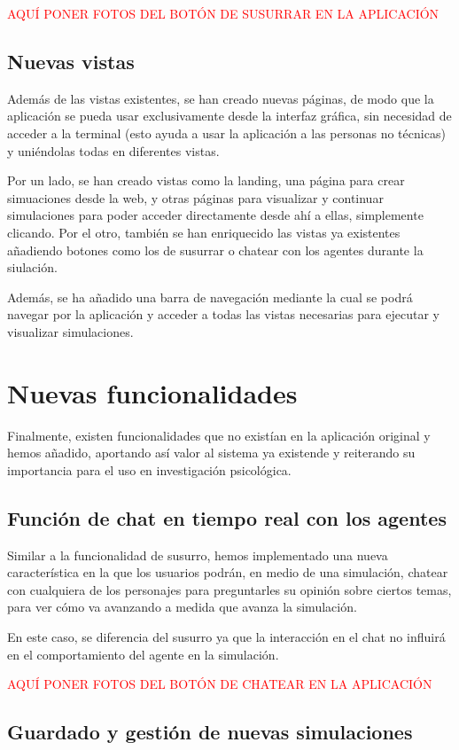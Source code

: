 \textcolor{red}{AQUÍ PONER FOTOS DEL BOTÓN DE SUSURRAR EN LA APLICACIÓN}

\subsection{Nuevas vistas}
Además de las vistas existentes, se han creado nuevas páginas, de modo que la aplicación se pueda usar exclusivamente desde la interfaz gráfica, sin necesidad de acceder a la terminal (esto ayuda a usar la aplicación a las personas no técnicas) y uniéndolas todas en diferentes vistas.

Por un lado, se han creado vistas como la landing, una página para crear simuaciones desde la web, y otras páginas para visualizar y continuar simulaciones para poder acceder directamente desde ahí a ellas, simplemente clicando. Por el otro, también se han enriquecido las vistas ya existentes añadiendo botones como los de susurrar o chatear con los agentes durante la siulación.

Además, se ha añadido una barra de navegación mediante la cual se podrá navegar por la aplicación y acceder a todas las vistas necesarias para ejecutar y visualizar simulaciones.

\section{Nuevas funcionalidades}
Finalmente, existen funcionalidades que no existían en la aplicación original y hemos añadido, aportando así valor al sistema ya existende y reiterando su importancia para el uso en investigación psicológica.

\subsection{Función de chat en tiempo real con los agentes}
Similar a la funcionalidad de susurro, hemos implementado una nueva característica en la que los usuarios podrán, en medio de una simulación, chatear con cualquiera de los personajes para preguntarles su opinión sobre ciertos temas, para ver cómo va avanzando a medida que avanza la simulación.

En este caso, se diferencia del susurro ya que la interacción en el chat no influirá en el comportamiento del agente en la simulación.

\textcolor{red}{AQUÍ PONER FOTOS DEL BOTÓN DE CHATEAR EN LA APLICACIÓN}

\subsection{Guardado y gestión de nuevas simulaciones}

